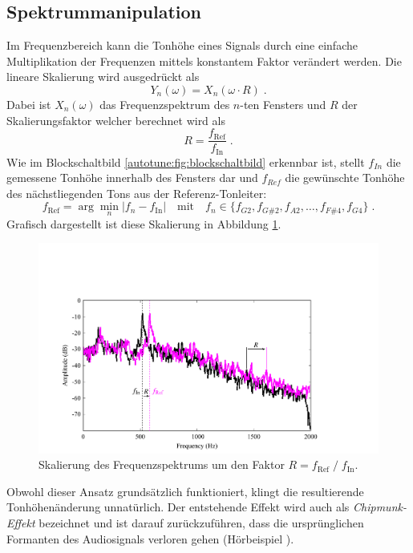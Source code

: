 \subsection{Spektrummanipulation
\label{autotune:subsection:spektrumManipulation}}
Im Frequenzbereich kann die Tonhöhe eines Signals durch eine einfache Multiplikation der Frequenzen mittels konstantem Faktor verändert werden.
Die lineare Skalierung wird ausgedrückt als
\begin{equation}
    Y_n(\omega)
    =
    X_n(\omega \cdot R) \;.
\end{equation}
Dabei ist $X_n(\omega)$ das Frequenzspektrum des $n$-ten Fensters und $R$ der Skalierungsfaktor welcher berechnet wird als
\begin{equation}
    R
    =
    \frac{f_{\text{Ref}}}{{f_{\text{In}}}} \;.
\end{equation}
Wie im Blockschaltbild \ref{autotune:fig:blockschaltbild} erkennbar ist,
stellt $f_{In}$ die gemessene Tonhöhe innerhalb des Fensters dar und $f_{Ref}$ die gewünschte Tonhöhe des nächstliegenden Tons aus der Referenz-Tonleiter:
\begin{equation}
    f_{\text{Ref}}
    =
    \arg\min_n \left| f_n - f_{\text{In}} \right|
    \quad \text{mit} \quad
    f_n \in \{ f_{G2}, f_{G\#2}, f_{A2}, \ldots, f_{F\#4}, f_{G4} \} \; .
\end{equation}
Grafisch dargestellt ist diese Skalierung in Abbildung \ref{autotune:fig:spektrumManipulation}.
\begin{figure}
    \centering
    \includegraphics[width=\textwidth]{papers/autotune/images/Spektrum-Manipulation.pdf}
    \caption{Skalierung des Frequenzspektrums um den Faktor $R = f_\text{Ref} \;/\;f_\text{In}$\;.}
    \label{autotune:fig:spektrumManipulation}
\end{figure}
Obwohl dieser Ansatz grundsätzlich funktioniert, klingt die resultierende Tonhöhenänderung unnatürlich.
Der entstehende Effekt wird auch als \emph{Chipmunk-Effekt} bezeichnet und ist darauf zurückzuführen,
dass die ursprünglichen Formanten des Audiosignals verloren gehen (Hörbeispiel \cite{autotune:audioExampleChipmunkEffect}).

